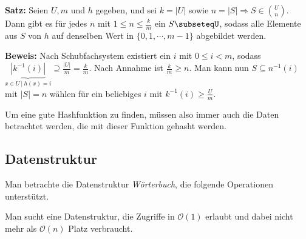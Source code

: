 \documentclass{scrartcl}%
\begin{document}
    \vspace*{0.3cm}
    \textbf{\textsf{Satz:}} Seien $U,m$ und $h$ gegeben, und sei $k=|U|$ sowie $n=|S| \Rightarrow S \in \binom{U}{n}$.
    Dann gibt es für jedes $n$ mit $1 \leq n \leq \frac{k}{m}$ ein $S\subseteqU$, sodass alle Elemente aus $S$ von $h$ auf denselben Wert in $\{0,1,\cdots,m-1\}$ abgebildet werden.

    \vspace*{0.3cm}
    \textbf{\textsf{Beweis:}} Nach Schubfachsystem existiert ein $i$ mit $0 \leq i < m$, sodass $\underbrace{|k^{-1}(i)|}_{x \in U\ |\ h(x)=i} \supseteq \frac{|U|}{m} = \frac{k}{m}$.
    Nach Annahme ist $\frac{k}{m}\geq n$.
    Man kann nun $S \subseteq n^{-1}(i)$ mit $|S|=n$ wählen für ein beliebiges $i$ mit $k^{-1}(i)\geq \frac{U}{m}$.\proofend

    Um eine gute Hashfunktion zu finden, müssen also immer auch die Daten betrachtet werden, die mit dieser Funktion gehasht werden.
    \newpage
    \subsection*{Datenstruktur}\label{subsec:datenstruktur}
    Man betrachte die Datenstruktur \textit{Wörterbuch}, die folgende Operationen unterstützt.

    \begin{figure}[H]
        \centering
    \end{figure}
    Man sucht eine Datenstruktur, die Zugriffe in $\mathcal{O}(1)$ erlaubt und dabei nicht mehr als $\mathcal{O}(n)$ Platz verbraucht.
\end{document}
